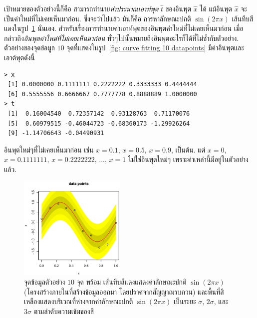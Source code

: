 เป้าหมายของตัวอย่างนี้ก็คือ สามารถทำนาย\textit{ค่าประมาณเอาท์พุต} $\hat{t}$ ของอินพุต $\hat{x}$ ได้ 
แม้อินพุต $\hat{x}$ จะเป็นค่าใหม่ที่ไม่เคยเห็นมาก่อน.
ซึ่งจะว่าไปแล้ว มันก็คือ การหาลักษณะปกติ $\sin(2 \pi x)$ เส้นทึบสีแดงในรูป~\ref{fig: curve fitting 10 datapoints with generating process} นั่นเอง.
%
สำหรับเรื่องการทำนายค่าเอาท์พุตของอินพุตค่าใหม่ที่ไม่เคยเห็นมาก่อน 
เมื่อกล่าวถึง\textit{อินพุตค่าใหม่ที่ไม่เคยเห็นมาก่อน} 
ทั่วๆไปนั้นหมายถึงอินพุตอะไรก็ได้ที่ไม่ซ้ำกับตัวอย่าง.
%
ตัวอย่างของจุดข้อมูล $10$ จุดที่แสดงในรูป~\ref{fig: curve fitting 10 datapoints} 
มีค่าอินพุตและเอาต์พุตดังนี้
\begin{verbatim}
> x
 [1] 0.0000000 0.1111111 0.2222222 0.3333333 0.4444444
 [6] 0.5555556 0.6666667 0.7777778 0.8888889 1.0000000
> t
 [1]  0.16004540  0.72357142  0.93128763  0.71170076
 [5]  0.60979515 -0.46044723 -0.68360173 -1.29926264
 [9] -1.14706643 -0.04490931
\end{verbatim}
อินพุตใหม่ๆที่ไม่เคยเห็นมาก่อน เช่น $x = 0.1$, $x = 0.5$, $x = 0.9$, เป็นต้น.
แต่ $x = 0$, $x = 0.1111111$, $x = 0.2222222$, ..., $x = 1$  ไม่ใช่อินพุตใหม่ๆ 
เพราะค่าเหล่านี้มีอยู่ในตัวอย่างแล้ว.

%
\begin{figure}
\begin{center}
\includegraphics[width=2.0in]
{02Background/bgCurveFit02.eps}
\end{center}
\caption{จุดข้อมูลตัวอย่าง $10$ จุด พร้อม เส้นทึบสีแดงแสดงค่าลักษณะปกติ $\sin(2 \pi x)$ (โครงสร้างภายในที่สร้างข้อมูลออกมา โดยปราศจากสัญญาณรบกวน) 
และพื้นที่สีเหลืองแสดงบริเวณที่ห่างจากค่าลักษณะปกติ $\sin(2 \pi x)$ เป็นระยะ $\sigma$, $2 \sigma$, และ $3 \sigma$ ตามลำดับความเข้มของสี}
\label{fig: curve fitting 10 datapoints with generating process}
\end{figure}
%

